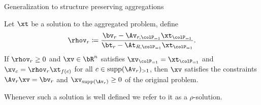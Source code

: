 \begin{frame}{Generalization to structure preserving aggregations}
    \begin{proposition}
        \label{ob:aggrconstr}
       Let \(\xt\) be a solution to the aggregated problem, define 
        \[\rhov_r \coloneqq \frac{\bv_r - \Av_{r, \colP_{=1}} \xt_{\colP_{=1}}}{\bt_r
            - \At_{R, \colP_{=1}} \xt_{\colP_{=1}}}.\]
        If \(\rhov_r \geq 0\) and \(\xv \in \bR^n\) satisfies \(\xv_{\colP_{=1}} = \xt_{\colP_{=1}}\) and \(\xv_{c} = \rhov_r \xt_{f(c)}\) for all \(c \in \supp(\Av_r)_{>1}\), then \(\xv\)  satisfies the constraints \(\Av_r \xv = \bv_r\) and \(\xv_{\supp(\Av_r)} \geq 0\) of the original problem.
    \end{proposition}
    
    Whenever such a solution is well defined we refer to it as a \(\rho\)-solution.
\end{frame}



